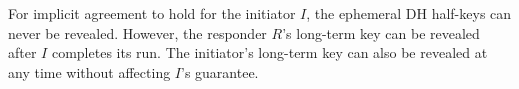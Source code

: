 For implicit agreement to hold for the initiator $I$, the ephemeral DH half-keys
can never be revealed.
%
However, the responder $R$'s long-term key can be revealed after $I$ completes
its run.
%
The initiator's long-term key can also be revealed at any time without affecting
$I$'s guarantee.\\
%

